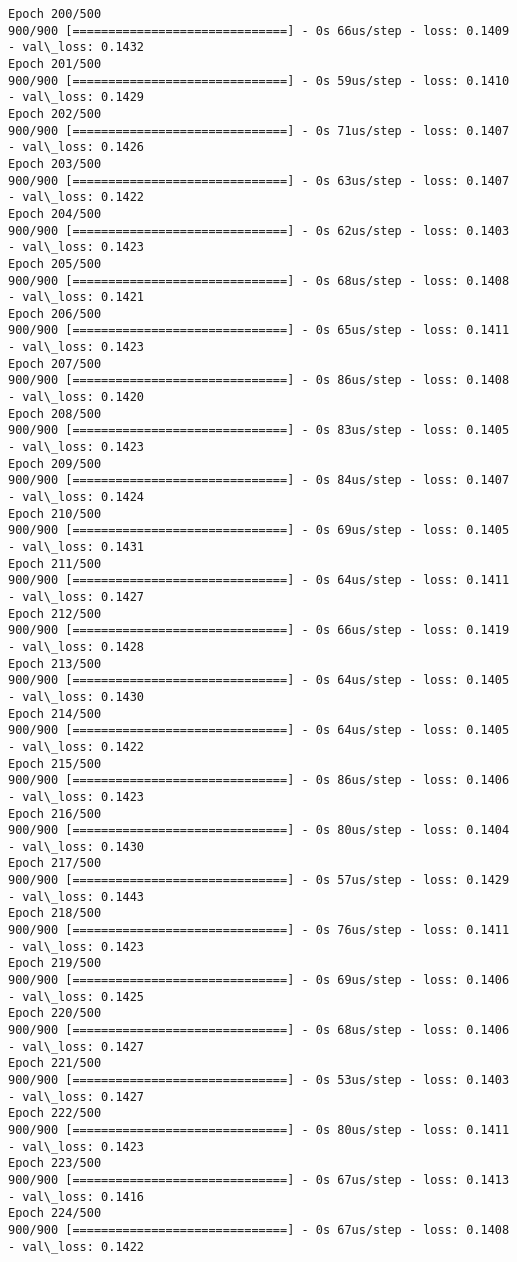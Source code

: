 \documentclass[11pt]{article}
\begin{document}
\begin{Verbatim}[commandchars=\\\{\}]
Epoch 200/500
900/900 [==============================] - 0s 66us/step - loss: 0.1409 - val\_loss: 0.1432
Epoch 201/500
900/900 [==============================] - 0s 59us/step - loss: 0.1410 - val\_loss: 0.1429
Epoch 202/500
900/900 [==============================] - 0s 71us/step - loss: 0.1407 - val\_loss: 0.1426
Epoch 203/500
900/900 [==============================] - 0s 63us/step - loss: 0.1407 - val\_loss: 0.1422
Epoch 204/500
900/900 [==============================] - 0s 62us/step - loss: 0.1403 - val\_loss: 0.1423
Epoch 205/500
900/900 [==============================] - 0s 68us/step - loss: 0.1408 - val\_loss: 0.1421
Epoch 206/500
900/900 [==============================] - 0s 65us/step - loss: 0.1411 - val\_loss: 0.1423
Epoch 207/500
900/900 [==============================] - 0s 86us/step - loss: 0.1408 - val\_loss: 0.1420
Epoch 208/500
900/900 [==============================] - 0s 83us/step - loss: 0.1405 - val\_loss: 0.1423
Epoch 209/500
900/900 [==============================] - 0s 84us/step - loss: 0.1407 - val\_loss: 0.1424
Epoch 210/500
900/900 [==============================] - 0s 69us/step - loss: 0.1405 - val\_loss: 0.1431
Epoch 211/500
900/900 [==============================] - 0s 64us/step - loss: 0.1411 - val\_loss: 0.1427
Epoch 212/500
900/900 [==============================] - 0s 66us/step - loss: 0.1419 - val\_loss: 0.1428
Epoch 213/500
900/900 [==============================] - 0s 64us/step - loss: 0.1405 - val\_loss: 0.1430
Epoch 214/500
900/900 [==============================] - 0s 64us/step - loss: 0.1405 - val\_loss: 0.1422
Epoch 215/500
900/900 [==============================] - 0s 86us/step - loss: 0.1406 - val\_loss: 0.1423
Epoch 216/500
900/900 [==============================] - 0s 80us/step - loss: 0.1404 - val\_loss: 0.1430
Epoch 217/500
900/900 [==============================] - 0s 57us/step - loss: 0.1429 - val\_loss: 0.1443
Epoch 218/500
900/900 [==============================] - 0s 76us/step - loss: 0.1411 - val\_loss: 0.1423
Epoch 219/500
900/900 [==============================] - 0s 69us/step - loss: 0.1406 - val\_loss: 0.1425
Epoch 220/500
900/900 [==============================] - 0s 68us/step - loss: 0.1406 - val\_loss: 0.1427
Epoch 221/500
900/900 [==============================] - 0s 53us/step - loss: 0.1403 - val\_loss: 0.1427
Epoch 222/500
900/900 [==============================] - 0s 80us/step - loss: 0.1411 - val\_loss: 0.1423
Epoch 223/500
900/900 [==============================] - 0s 67us/step - loss: 0.1413 - val\_loss: 0.1416
Epoch 224/500
900/900 [==============================] - 0s 67us/step - loss: 0.1408 - val\_loss: 0.1422

\end{Verbatim}
\end{document}
